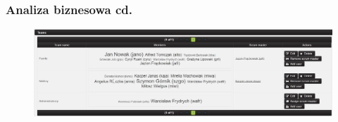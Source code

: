 \documentclass[hyperref={pdfpagelabels=false}]{beamer}
\begin{document}
\begin{frame}
	\frametitle{Analiza biznesowa cd.}
	\begin{figure}
		\centering
		\includegraphics[height=0.5\linewidth, width=1\linewidth]{team-list}
	\end{figure}
\end{frame}
\end{document}
